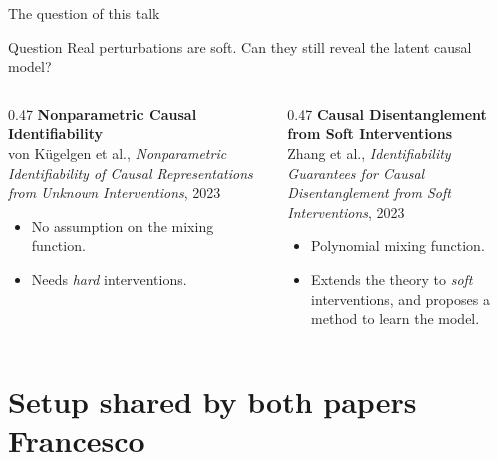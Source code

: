 \documentclass[11pt,aspectratio=169]{beamer}
\begin{document}
\begin{frame}{The question of this talk}
	\begin{block}{Question}
		Real perturbations are soft. Can they still reveal the latent causal model?
	\end{block}
	\medskip
	\begin{columns}[onlytextwidth,t]
		\begin{column}{0.47\textwidth}
			\onslide<2->
			\textbf{Nonparametric Causal Identifiability}\\
			von K\"ugelgen et al., \emph{Nonparametric Identifiability of Causal Representations from Unknown Interventions}, 2023
			\begin{itemize}
				\item No assumption on the mixing function.
				\item Needs \emph{hard} interventions.
			\end{itemize}
		\end{column}
		\begin{column}{0.47\textwidth}
			\onslide<3->
			\textbf{Causal Disentanglement from Soft Interventions}\\
			Zhang et al., \emph{Identifiability Guarantees for Causal Disentanglement from Soft Interventions}, 2023
			\begin{itemize}
				\item Polynomial mixing function.
				\item Extends the theory to \emph{soft} interventions, and proposes a method to learn the model.
			\end{itemize}
		\end{column}
	\end{columns}
\end{frame}

\section{Setup shared by both papers \hfill {\normalsize Francesco}}
\end{document}
